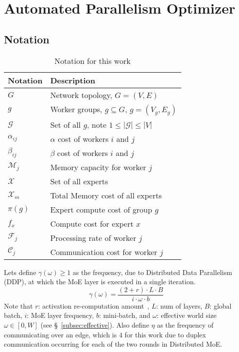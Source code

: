 \section{Automated Parallelism Optimizer}\label{sec:automated-parallelism-optimizer}
\subsection{Notation}\label{subsec:notation}
\begin{table}[!h]
    \centering
    \caption{Notation for this work}
    \begin{tabular}{ll}
        \toprule
        \textbf{Notation} & \textbf{Description} \\
        \midrule
        $G$ & Network topology, $G = (V, E)$\\
        $g$ & Worker groups, $g \subseteq G$, $g = (V_g, E_g)$ \\
        $\mathcal{G}$ & Set of all $g$, note $ 1 \leq |\mathcal{G}| \leq |V|$ \\
        $\alpha_{ij}$ & $\alpha$ cost of workers $i$ and $j$ \\
        $\beta_{ij}$ & $\beta$ cost of workers $i$ and $j$\\
        $\mathcal{M}_j$ & Memory capacity for worker $j$\\
        $\mathcal{X}$ & Set of all experts \\
        $\mathcal{X}_m$ & Total Memory cost of all experts\\
        $\pi(g)$ & Expert compute cost of group $g$\\
        $f_x$ & Compute cost for expert $x$\\
        $\mathcal{F}_j$ & Processing rate of worker $j$\\
        $\mathcal{C}_j$ & Communication cost for worker $j$\\
    \end{tabular}
    \label{tab:LPnotation}
\end{table}

Lets define $\gamma(\omega) \geq 1$ as the frequency, due to Distributed Data Parallelism (DDP),
at which the MoE layer is executed in a single iteration.
\begin{equation}\label{eq:gamma}
\gamma(\omega) = \frac{(2 + r)\cdot L \cdot B}{i \cdot \omega \cdot b}
\end{equation}
Note that $r$: activation re-computation amount~\cite{megatron-lm}, $L$: num of layers, $B$: global batch,
$i$: MoE layer frequency, $b$: mini-batch, and
$\omega$: effective world size $\omega \in [0, W]$ (see \S~\ref{subsec:effective}).
Also define $\eta$ as the frequency of communicating over an edge,
which is $4$ for this work due to duplex communication occurring for each of the two rounds in Distributed MoE.

